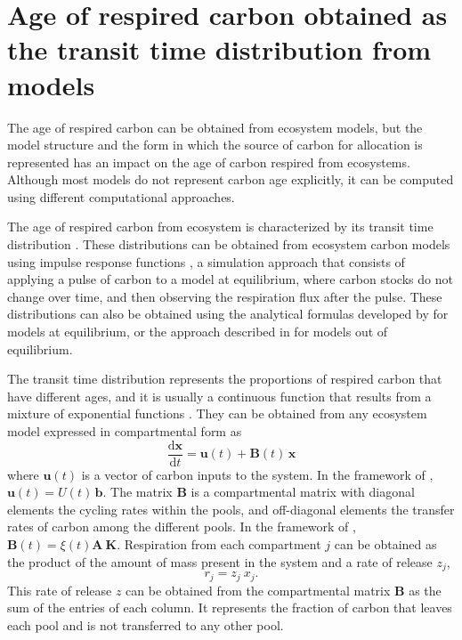 \documentclass[12pt, a4paper]{article}
\newcommand{\red}[1]{{\color{red}#1}}
\begin{document}


\section{Age of respired carbon obtained as the transit time distribution from models}
The age of respired carbon can be obtained from ecosystem models, but the model structure and the form in which the source of carbon for allocation is represented has an impact on the age of carbon respired from ecosystems. Although most models do not represent carbon age explicitly, it can be computed using different computational approaches.

The age of respired carbon from ecosystem is characterized by its transit time distribution \citep{Bolin1973, Thompson1999, Sierra2021JE}. These distributions can be obtained from ecosystem carbon models using impulse response functions \citep{Thompson1999}, a simulation approach that consists of applying a pulse of carbon to a model at equilibrium, where carbon stocks do not change over time, and then observing the respiration flux after the pulse. These distributions can also be obtained using the analytical formulas developed by \citet{Metzler2018MG} for models at equilibrium, or the approach described in \citet{Metzler2018PNAS} for models out of equilibrium.

The transit time distribution represents the proportions of respired carbon that have different ages, and it is usually a continuous function that results from a mixture of exponential functions \citep{Metzler2018MG}. They can be obtained from any ecosystem model expressed in compartmental form as
\begin{equation}
\frac{\mathrm{d}\bm{x}}{\mathrm{d}t} = \bm{u}(t) + \mathbf{B}(t) \, \bm{x}
\end{equation}
where $\bm{u}(t)$ is a vector of carbon inputs to the system. In the framework of \citet{Luo2017}, $\bm{u}(t) = U(t)\, \bm{b}$. The matrix $\mathbf{B}$ is a compartmental matrix with diagonal elements the cycling rates within the pools, and off-diagonal elements the transfer rates of carbon among the different pools. In the framework of \citet{Luo2017}, $\mathbf{B}(t) = \xi(t) \mathbf{A \ K}$. Respiration from each compartment $j$ can be obtained as the product of the amount of mass present in the system and a rate of release $z_j$, 
\begin{equation}
r_j = z_j \ x_j.
\end{equation}
This rate of release $z$ can be obtained from the compartmental matrix $\mathbf{B}$ as the sum of the entries of each column. It represents the fraction of carbon that leaves each pool and is not transferred to any other pool.
\end{document}
